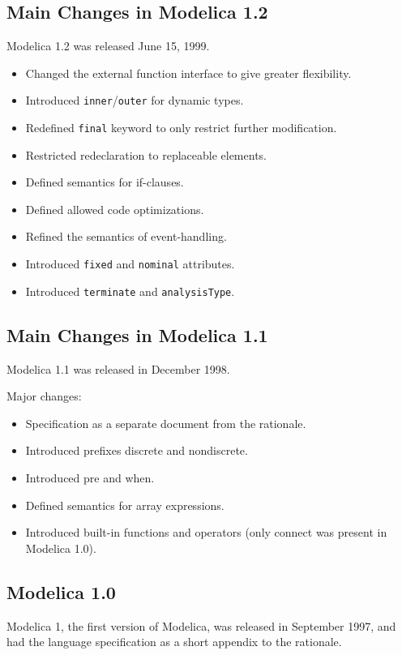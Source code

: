 \subsection{Main Changes in Modelica 1.2}
Modelica 1.2 was released June 15, 1999.

\begin{itemize}
\item
  Changed the external function interface to give greater flexibility.
\item
  Introduced \lstinline!inner!/\lstinline!outer! for dynamic types.
\item
  Redefined \lstinline!final! keyword to only restrict further
  modification.
\item
  Restricted redeclaration to replaceable elements.
\item
  Defined semantics for if-clauses.
\item
  Defined allowed code optimizations.
\item
  Refined the semantics of event-handling.
\item
  Introduced \lstinline!fixed! and \lstinline!nominal! attributes.
\item
  Introduced \lstinline!terminate! and \lstinline!analysisType!.
\end{itemize}

\subsection{Main Changes in Modelica 1.1}
Modelica 1.1 was released in December 1998.

Major changes:

\begin{itemize}
\item
  Specification as a separate document from the rationale.
\item
  Introduced prefixes discrete and nondiscrete.
\item
  Introduced pre and when.
\item
  Defined semantics for array expressions.
\item
  Introduced built-in functions and operators (only connect was present
  in Modelica 1.0).
\end{itemize}

\subsection{Modelica 1.0}

Modelica 1, the first version of Modelica, was released in September
1997, and had the language specification as a short appendix to the
rationale.
